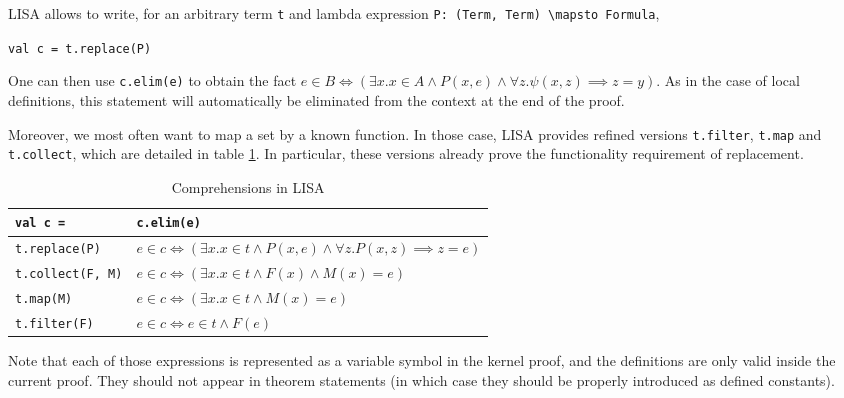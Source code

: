 LISA allows to write, for an arbitrary term \lstinline|t| and lambda expression \lstinline|P: (Term, Term) \mapsto Formula|,
\begin{center}
  \lstinline|val c = t.replace(P)|
\end{center}
One can then use \lstinline|c.elim(e)| to obtain the fact 
$e \in B \iff (\exists x. x \in A \land P(x, e) \land \forall z. \psi(x, z) \implies z = y)$. As in the case of local definitions, this statement will automatically be eliminated from the context at the end of the proof.

Moreover, we most often want to map a set by a known function. In those case, LISA provides refined versions \lstinline|t.filter|, \lstinline|t.map| and \lstinline|t.collect|, which are detailed in table \ref{tab:comprehensions}. In particular, these versions already prove the functionality requirement of replacement.
\begin{table}[h]
  \begin{tabular}{l|l}
    \textbf{\lstinline|val c = |} & \textbf{\lstinline|c.elim(e)|} \\ \hline
    \lstinline|t.replace(P)| & $e \in c \iff (\exists x. x \in t \land P(x, e) \land ∀ z. P(x, z) \implies z = e)$ \\
    \lstinline|t.collect(F, M)| & $e \in c \iff (\exists x. x \in t \land F(x) \land M(x) = e)$ \\
    \lstinline|t.map(M)| & $e \in c \iff (\exists x. x \in t \land M(x) = e)$ \\
    \lstinline|t.filter(F)| & $e \in c \iff e \in t \land F(e)$ \\   
  \end{tabular}
  \caption{Comprehensions in LISA}
  \label{tab:comprehensions}
\end{table}

Note that each of those expressions is represented as a variable symbol in the kernel proof, and the definitions are only valid inside the current proof. They should not appear in theorem statements (in which case they should be properly introduced as defined constants).
